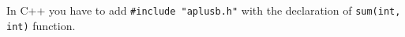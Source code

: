 In C++ you have to add \texttt{#include "aplusb.h"} with the declaration of \texttt{sum(int, int)} function.
